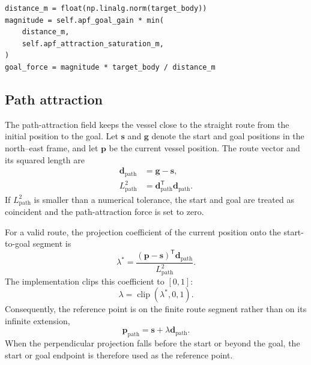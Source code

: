 \documentclass[11pt,a4paper]{article}
\begin{document}
\begin{lstlisting}
distance_m = float(np.linalg.norm(target_body))
magnitude = self.apf_goal_gain * min(
    distance_m,
    self.apf_attraction_saturation_m,
)
goal_force = magnitude * target_body / distance_m
\end{lstlisting}

\subsection{Path attraction}

The path-attraction field keeps the vessel close to the straight route from the
initial position to the goal. Let $\bm{s}$ and $\bm{g}$ denote the start and
goal positions in the north--east frame, and let $\bm{p}$ be the current vessel
position. The route vector and its squared length are
\begin{equation}
\begin{aligned}
\bm{d}_{\mathrm{path}} &= \bm{g}-\bm{s},\\
L_{\mathrm{path}}^2 &= \bm{d}_{\mathrm{path}}^{\mathsf T}
\bm{d}_{\mathrm{path}}.
\end{aligned}
\end{equation}
If $L_{\mathrm{path}}^2$ is smaller than a numerical tolerance, the start and
goal are treated as coincident and the path-attraction force is set to zero.

For a valid route, the projection coefficient of the current position onto the
start-to-goal segment is
\begin{equation}
\lambda^{*}=
\frac{(\bm{p}-\bm{s})^{\mathsf T}\bm{d}_{\mathrm{path}}}
{L_{\mathrm{path}}^2}.
\end{equation}
The implementation clips this coefficient to $[0,1]$:
\begin{equation}
\lambda=\operatorname{clip}(\lambda^{*},0,1).
\end{equation}
Consequently, the reference point is on the finite route segment rather than
on its infinite extension,
\begin{equation}
\bm{p}_{\mathrm{path}}=\bm{s}+\lambda\bm{d}_{\mathrm{path}}.
\end{equation}
When the perpendicular projection falls before the start or beyond the goal,
the start or goal endpoint is therefore used as the reference point.
\end{document}
